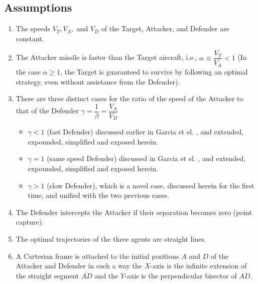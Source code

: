 \subsection*{Assumptions}
\begin{enumerate}
\item The speeds $V_{T},V_{A},$ and $V_{D}$ of the Target, Attacker, and Defender are constant.
\item The Attacker missile is faster than the Target aircraft, i.e., $\alpha\equiv \dfrac{V_{T}}{V_{A}}<1$ (In the case $\alpha\geq1$, the Target is guaranteed to survive by following an optimal strategy, even without assistance from the Defender).
\item There are three distinct cases for the ratio of the speed of the Attacker to that of the Defender $\gamma=\dfrac{1}{\beta}=\dfrac{V_{A}}{V_{D}}$ 
\begin{itemize}
\item $\gamma<1$ (fast Defender) discussed earlier in Garcia et el. \cite{garcia2015active}, and extended, expounded, simplified and exposed herein.
\item $\gamma =1$ (same speed Defender) discussed in Garcia et el. \cite{pachter2014active,garcia2015escape}, and extended, expounded, simplified and exposed herein.
\item $\gamma>1$ (slow Defender), which is a novel case, discussed herein for the first time, and unified with the two previous cases.  
\end{itemize}

\item The Defender intercepts the Attacker if their separation becomes zero (point capture).
\item The optimal trajectories of the three agents are straight lines.
\item A Cartesian frame is attached to the initial positions $A$ and $D$ of the Attacker and Defender in such a way the $X$-axis is the infinite extension of the straight segment $\overline{AD}$ and the $Y$-axis is the perpendicular bisector of $\overline{AD}$.
\end{enumerate}

